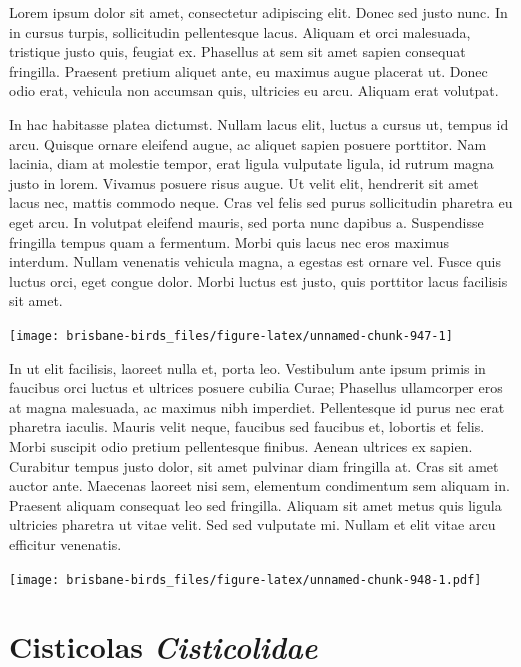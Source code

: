 \documentclass[]{book}
\let\origfigure\figure
\let\endorigfigure\endfigure
\renewenvironment{figure}[1][2] {
  \expandafter\origfigure\expandafter[H]
} {
  \endorigfigure
}
\begin{document}
Lorem ipsum dolor sit amet, consectetur adipiscing elit. Donec sed justo
nunc. In in cursus turpis, sollicitudin pellentesque lacus. Aliquam et
orci malesuada, tristique justo quis, feugiat ex. Phasellus at sem sit
amet sapien consequat fringilla. Praesent pretium aliquet ante, eu
maximus augue placerat ut. Donec odio erat, vehicula non accumsan quis,
ultricies eu arcu. Aliquam erat volutpat.

In hac habitasse platea dictumst. Nullam lacus elit, luctus a cursus ut,
tempus id arcu. Quisque ornare eleifend augue, ac aliquet sapien posuere
porttitor. Nam lacinia, diam at molestie tempor, erat ligula vulputate
ligula, id rutrum magna justo in lorem. Vivamus posuere risus augue. Ut
velit elit, hendrerit sit amet lacus nec, mattis commodo neque. Cras vel
felis sed purus sollicitudin pharetra eu eget arcu. In volutpat eleifend
mauris, sed porta nunc dapibus a. Suspendisse fringilla tempus quam a
fermentum. Morbi quis lacus nec eros maximus interdum. Nullam venenatis
vehicula magna, a egestas est ornare vel. Fusce quis luctus orci, eget
congue dolor. Morbi luctus est justo, quis porttitor lacus facilisis sit
amet.

\begin{figure}
\texttt{[image: brisbane-birds\_files/figure-latex/unnamed-chunk-947-1]} \caption{insert figure caption}\label{fig:unnamed-chunk-947}
\end{figure}

In ut elit facilisis, laoreet nulla et, porta leo. Vestibulum ante ipsum
primis in faucibus orci luctus et ultrices posuere cubilia Curae;
Phasellus ullamcorper eros at magna malesuada, ac maximus nibh
imperdiet. Pellentesque id purus nec erat pharetra iaculis. Mauris velit
neque, faucibus sed faucibus et, lobortis et felis. Morbi suscipit odio
pretium pellentesque finibus. Aenean ultrices ex sapien. Curabitur
tempus justo dolor, sit amet pulvinar diam fringilla at. Cras sit amet
auctor ante. Maecenas laoreet nisi sem, elementum condimentum sem
aliquam in. Praesent aliquam consequat leo sed fringilla. Aliquam sit
amet metus quis ligula ultricies pharetra ut vitae velit. Sed sed
vulputate mi. Nullam et elit vitae arcu efficitur venenatis.

\begin{figure}
\centering
\texttt{[image: brisbane-birds\_files/figure-latex/unnamed-chunk-948-1.pdf]}
\caption{\label{fig:unnamed-chunk-948}insert figure caption}
\end{figure}

\chapter{\texorpdfstring{Cisticolas
\emph{Cisticolidae}}{Cisticolas Cisticolidae}}\label{cisticolas-cisticolidae}
\end{document}
